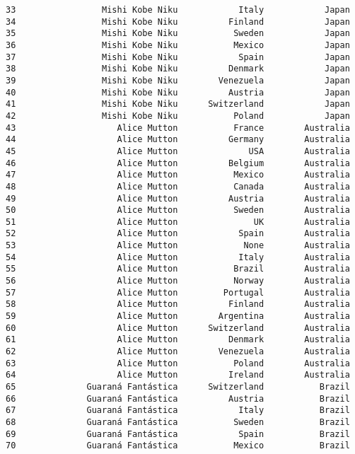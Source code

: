 \documentclass[11pt]{article}
\begin{document}
\begin{tcolorbox}[breakable, size=fbox, boxrule=.5pt, pad at break*=1mm, opacityfill=0]
\begin{Verbatim}[commandchars=\\\{\}]
33                 Mishi Kobe Niku            Italy            Japan
34                 Mishi Kobe Niku          Finland            Japan
35                 Mishi Kobe Niku           Sweden            Japan
36                 Mishi Kobe Niku           Mexico            Japan
37                 Mishi Kobe Niku            Spain            Japan
38                 Mishi Kobe Niku          Denmark            Japan
39                 Mishi Kobe Niku        Venezuela            Japan
40                 Mishi Kobe Niku          Austria            Japan
41                 Mishi Kobe Niku      Switzerland            Japan
42                 Mishi Kobe Niku           Poland            Japan
43                    Alice Mutton           France        Australia
44                    Alice Mutton          Germany        Australia
45                    Alice Mutton              USA        Australia
46                    Alice Mutton          Belgium        Australia
47                    Alice Mutton           Mexico        Australia
48                    Alice Mutton           Canada        Australia
49                    Alice Mutton          Austria        Australia
50                    Alice Mutton           Sweden        Australia
51                    Alice Mutton               UK        Australia
52                    Alice Mutton            Spain        Australia
53                    Alice Mutton             None        Australia
54                    Alice Mutton            Italy        Australia
55                    Alice Mutton           Brazil        Australia
56                    Alice Mutton           Norway        Australia
57                    Alice Mutton         Portugal        Australia
58                    Alice Mutton          Finland        Australia
59                    Alice Mutton        Argentina        Australia
60                    Alice Mutton      Switzerland        Australia
61                    Alice Mutton          Denmark        Australia
62                    Alice Mutton        Venezuela        Australia
63                    Alice Mutton           Poland        Australia
64                    Alice Mutton          Ireland        Australia
65              Guaraná Fantástica      Switzerland           Brazil
66              Guaraná Fantástica          Austria           Brazil
67              Guaraná Fantástica            Italy           Brazil
68              Guaraná Fantástica           Sweden           Brazil
69              Guaraná Fantástica            Spain           Brazil
70              Guaraná Fantástica           Mexico           Brazil

\end{Verbatim}
\end{tcolorbox}
\end{document}
